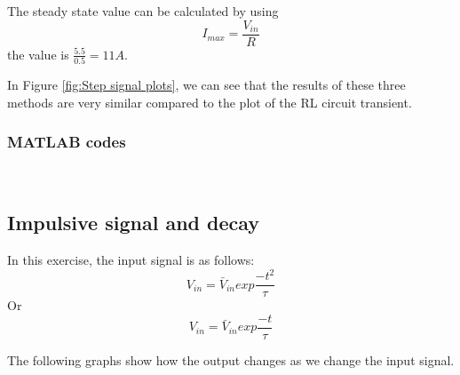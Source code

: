 \documentclass[a4paper, 12pt]{article}
\begin{document}
The steady state value can be calculated by using
\[I_{max} = \frac{V_{in}}{R}\] the value is $\frac{5.5}{0.5} = 11A$.\par
\vspace{5mm}

In Figure \ref{fig:Step signal plots}, we can see that the results of these three methods are very similar compared to the plot of the RL circuit transient.


\subsubsection{MATLAB codes}
\





\newpage
\subsection{Impulsive signal and decay}
In this exercise, the input signal is as follows:
\begin{equation}\label{Exp eqn 1}
V_{in} = \bar{V}_{in} exp{\frac{-t^{2}}{\tau }}
\end{equation}
Or
\begin{equation}\label{Exp eqn 2}
V_{in} = \bar{V}_{in} exp{\frac{-t}{\tau }}
\end{equation}

The following graphs show how the output changes as we change the input signal.\par
\end{document}
